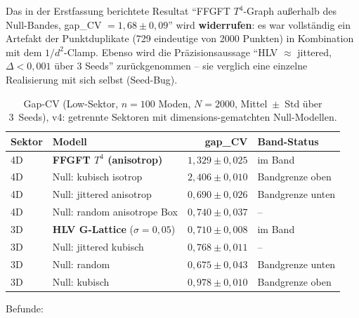 \begin{remark}
Das in der Erstfassung berichtete Resultat
\enquote{FFGFT $T^4$-Graph außerhalb des Null-Bandes,
gap\_CV $=1{,}68\pm0{,}09$} wird \textbf{widerrufen}: es war
vollständig ein Artefakt der Punktduplikate (729 eindeutige von
2000 Punkten) in Kombination mit dem $1/d^2$-Clamp. Ebenso wird die
Präzisionsaussage \enquote{HLV $\approx$ jittered, $\Delta<0{,}001$
über 3 Seeds} zurückgenommen -- sie verglich eine einzelne Realisierung
mit sich selbst (Seed-Bug).
\end{remark}

\begin{table}[ht]
\centering
\caption{Gap-CV (Low-Sektor, $n{=}100$ Moden, $N{=}2000$,
Mittel~$\pm$~Std über 3~Seeds), v4: getrennte Sektoren mit
dimensions-gematchten Null-Modellen.}
\label{tab:gap275v4}
\begin{tabular}{@{}llrl@{}}
\toprule
Sektor & Modell & gap\_CV & Band-Status \\
\midrule
4D & \textbf{FFGFT $T^4$ (anisotrop)} & $1{,}329\pm0{,}025$ & im Band \\
4D & Null: kubisch isotrop            & $2{,}406\pm0{,}010$ & Bandgrenze oben \\
4D & Null: jittered anisotrop         & $0{,}690\pm0{,}026$ & Bandgrenze unten \\
4D & Null: random anisotrope Box      & $0{,}740\pm0{,}037$ & -- \\
\midrule
3D & \textbf{HLV G-Lattice} ($\sigma{=}0{,}05$) & $0{,}710\pm0{,}008$ & im Band \\
3D & Null: jittered kubisch           & $0{,}768\pm0{,}011$ & -- \\
3D & Null: random                     & $0{,}675\pm0{,}043$ & Bandgrenze unten \\
3D & Null: kubisch                    & $0{,}978\pm0{,}010$ & Bandgrenze oben \\
\bottomrule
\end{tabular}
\end{table}

Befunde:

